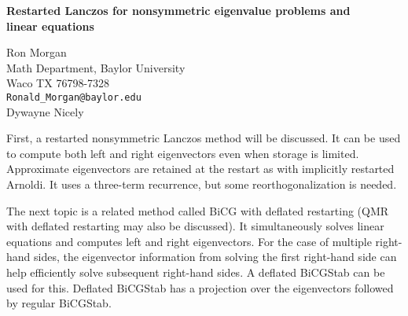 \documentclass{report}
\begin{document}

\begin{center}
{\large
{\bf Restarted Lanczos for nonsymmetric eigenvalue problems and \\
	linear equations}}

	Ron Morgan \\
	Math Department, Baylor University \\
	Waco TX 76798-7328 \\
	{\tt Ronald\_Morgan@baylor.edu} \\
	Dywayne Nicely
\end{center}
First, a restarted nonsymmetric Lanczos method will be
discussed. It can be used to compute both left and right
eigenvectors even when storage is limited. Approximate
eigenvectors are retained at the restart as with implicitly
restarted Arnoldi. It uses a three-term recurrence, but some
reorthogonalization is needed.

The next topic is a
related method called BiCG with deflated restarting (QMR
with deflated restarting may also be discussed). It
simultaneously solves linear equations and computes left and
right eigenvectors. For the case of multiple right-hand
sides, the eigenvector information from solving the first
right-hand side can help efficiently solve subsequent
right-hand sides. A deflated BiCGStab can be used for this.
Deflated BiCGStab has a projection over the eigenvectors
followed by regular BiCGStab.



\end{document}
